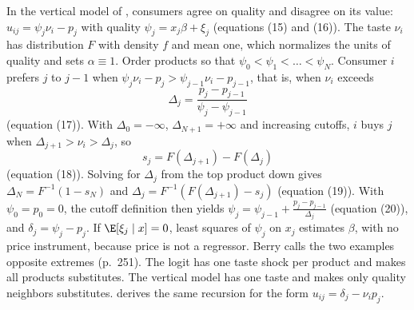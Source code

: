 In the vertical model of \citet{Bresnahan1987}, consumers agree on quality and disagree on its value:
$u_{ij} = \psi_j\nu_i - p_j$ with quality $\psi_j = x_j\beta + \xi_j$ (equations (15) and (16)). The taste
$\nu_i$ has distribution $F$ with density $f$ and mean one, which normalizes the units of quality and sets
$\alpha \equiv 1$. Order products so that $\psi_0 < \psi_1 < \dots < \psi_N$. Consumer $i$ prefers $j$ to $j-1$
when $\psi_j\nu_i - p_j > \psi_{j-1}\nu_i - p_{j-1}$, that is, when $\nu_i$ exceeds
\begin{equation*}
\Delta_j = \frac{p_j - p_{j-1}}{\psi_j - \psi_{j-1}}
\end{equation*}
(equation (17)). With $\Delta_0 = -\infty$, $\Delta_{N+1} = +\infty$ and increasing cutoffs, $i$ buys $j$ when
$\Delta_{j+1} > \nu_i > \Delta_j$, so
\begin{equation}\label{eq:07-berry-vert-share}
s_j = F(\Delta_{j+1}) - F(\Delta_j)
\end{equation}
(equation (18)). Solving for $\Delta_j$ from the top product down gives $\Delta_N = F^{-1}(1 - s_N)$ and
$\Delta_j = F^{-1}(F(\Delta_{j+1}) - s_j)$ (equation (19)). With $\psi_0 = p_0 = 0$, the cutoff definition then
yields $\psi_j = \psi_{j-1} + \frac{p_j - p_{j-1}}{\Delta_j}$ (equation (20)), and $\delta_j = \psi_j - p_j$. If
$\E[\xi_j \mid x] = 0$, least squares of $\psi_j$ on $x_j$ estimates $\beta$, with no price instrument, because
price is not a regressor. Berry calls the two examples opposite extremes (p.~251). The logit has one taste shock
per product and makes all products substitutes. The vertical model has one taste and makes only quality
neighbors substitutes.  derives the same recursion for the form $u_{ij} = \delta_j - \nu_ip_j$.

